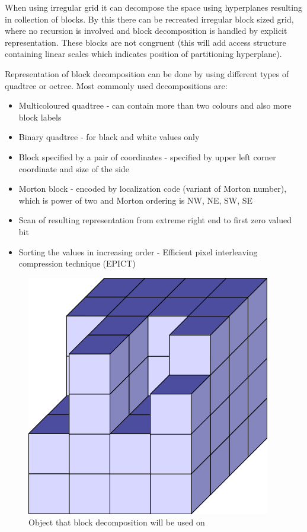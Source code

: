 When using irregular grid it can decompose the space using hyperplanes resulting in collection of blocks. By this there can be recreated irregular block sized grid, where no recursion is involved and block decomposition is handled by explicit representation. These blocks are not congruent (this will add access structure containing linear scales which indicates position of partitioning hyperplane).

Representation of block decomposition can be done by using different types of quadtree or octree. Most commonly used decompositions are:
\begin{itemize}
\item Multicoloured quadtree - can contain more than two colours and also more block labels
\item Binary quadtree - for black and white values only
\item Block specified by a pair of coordinates - specified by upper left corner coordinate and size of the side
\item Morton block - encoded by localization code (variant of Morton number), which is power of two and Morton ordering is NW, NE, SW, SE
\item Scan of resulting representation from extreme right end to first zero valued bit
\item Sorting the values in increasing order - Efficient pixel interleaving compression technique (EPICT)
\end{itemize}
\begin{figure}
\centering
\includegraphics[scale=0.5]{mat3d_todo.png}
\caption{Object that block decomposition will be used on}
\end{figure}

